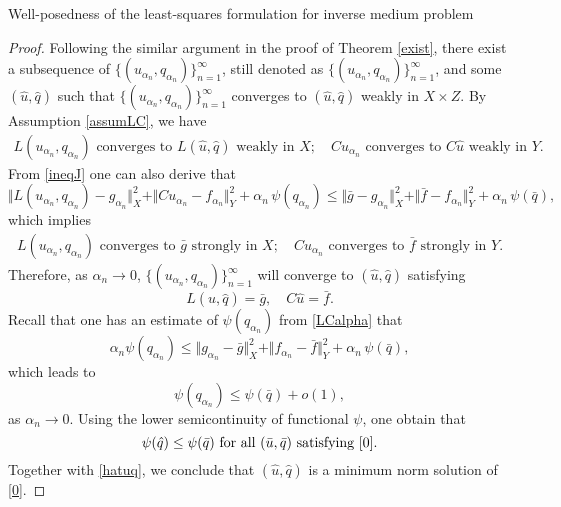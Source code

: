\documentclass[11pt]{article}%
\renewcommand{\_}{{\fontfamily{ptm}\selectfont\textunderscore}}
\theoremstyle{plain}
\numberwithin{equation}{section}
\begin{document}
\begin{section}{Well-posedness of the least-squares formulation for inverse medium problem}
\begin{proof}
 Following the similar argument in the proof of Theorem \ref{exist}, there exist a subsequence of $\{(u_{\alpha_n}, q_{\alpha_n})\}_{n=1}^\infty$, still denoted as $\{(u_{\alpha_n}, q_{\alpha_n})\}_{n=1}^\infty$, and some $(\hat{u},\hat{q})$ such that 
 $\{(u_{\alpha_n},q_{\alpha_n})\}_{n=1}^\infty$ converges to $ (\hat{u}, \hat{q})$ weakly in $X\times Z$. 
 By Assumption \ref{assumLC}, we have
\begin{eqnarray*}
L(u_{\alpha_n},q_{\alpha_n})\text{ converges to } L(\hat{u}, \hat{q})\text{ weakly in }X; \quad Cu_{\alpha_n} \text{ converges to } C\hat{u}\text{ weakly in }Y.
\end{eqnarray*}
 From \eqref{ineqJ} one can also derive that
 \begin{equation}\label{LCalpha}
  \Vert L(u_{\alpha_n},q_{\alpha_n})- g_{\alpha_n}\Vert_{X}^2+\Vert Cu_{\alpha_n}-f_{\alpha_n}\Vert_{Y}^2+\alpha_n\,\psi(q_{\alpha_n})\leq \Vert \bar{g}- g_{\alpha_n}\Vert_{X}^2+\Vert \bar{f}-f_{\alpha_n}\Vert_{Y}^2+\alpha_n\,\psi(\bar{q}),
  \end{equation}
  which implies 
  \begin{eqnarray*}
L(u_{\alpha_n},q_{\alpha_n})\text{ converges to } \bar{g} \text{ strongly in }X; \quad Cu_{\alpha_n} \text{ converges to } \bar{f} \text{ strongly in }Y.
\end{eqnarray*}
  Therefore, as $\alpha_n\to 0$,  $\{(u_{\alpha_n},q_{\alpha_n})\}_{n=1}^\infty$ will converge to $(\hat{u},\hat{q})$ satisfying
\begin{equation}\label{hatuq}
L(\hat{u},\hat{q})=\bar{g},\quad C\hat{u}=\bar{f}.
\end{equation}
Recall that one has an estimate of $\psi(q_{\alpha_n})$ from \eqref{LCalpha} that \begin{equation}
\alpha_n\psi(q_{\alpha_n})\le \Vert g_{\alpha_n}-\bar{g}\Vert_X^2+\Vert f_{\alpha_n}-\bar{f}\Vert_Y^2+\alpha_n\,\psi(\bar{q}),\nonumber
\end{equation}
which leads to 
\begin{equation}
\psi(q_{\alpha_n})\le\psi(\bar{q})+o(1),\nonumber
\end{equation}
as $\alpha_n\to 0$. Using the lower semicontinuity of functional $\psi$, one obtain that 
$$
\psi(\hat{q})\le \psi(\bar{q}) \mbox{ for all $(\bar{u},\bar{q})$ satisfying \eqref{0}}.
$$
Together with \eqref{hatuq}, we conclude that  $(\hat{u},\hat{q})$ is a minimum norm solution of \eqref{0}.
\end{proof}

\end{section}
\end{document}
